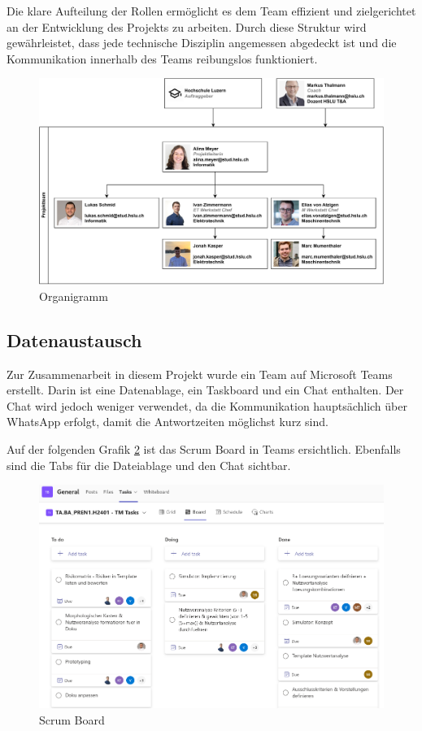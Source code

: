Die klare Aufteilung der Rollen ermöglicht es dem Team effizient und zielgerichtet an der Entwicklung des Projekts zu arbeiten. Durch diese Struktur wird gewährleistet, dass jede technische Disziplin angemessen abgedeckt ist und die Kommunikation innerhalb des Teams reibungslos funktioniert.

\begin{figure}[H]
\centering
\includegraphics[width=\textwidth]{img/Projektorganisation.pdf}
\caption{Organigramm}
\label{fig:Organigramm}
\end{figure}

\subsection{Datenaustausch}\label{datenaustausch}

Zur Zusammenarbeit in diesem Projekt wurde ein Team auf Microsoft Teams erstellt.
Darin ist eine Datenablage, ein Taskboard und ein Chat enthalten. Der Chat wird jedoch weniger verwendet, da die Kommunikation hauptsächlich über WhatsApp erfolgt, damit die Antwortzeiten möglichst kurz sind.

Auf der folgenden Grafik \ref{fig:scrum-board} ist das Scrum Board in Teams ersichtlich. Ebenfalls sind die Tabs für die Dateiablage und den Chat sichtbar.

\begin{figure}[H]
\centering
\includegraphics[width=\textwidth]{img/scrum-board.png}
\caption{Scrum Board}
\label{fig:scrum-board}
\end{figure}

